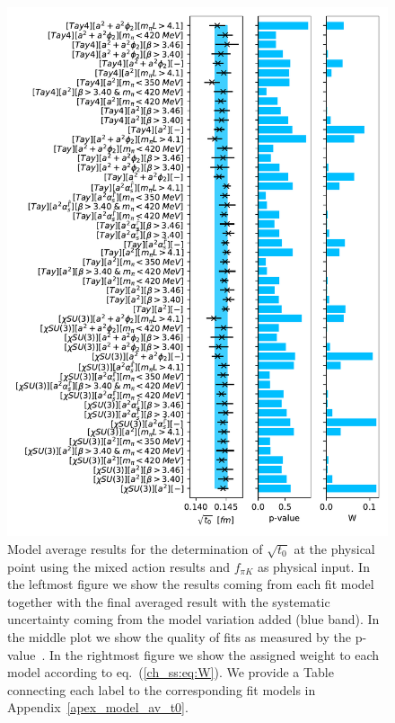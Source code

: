 {\begin{figure}
    \centering
    \includegraphics[width=1.\textwidth]{./cap5/figs/BMA_tm.pdf}
    \caption{Model average results for the determination of $\sqrt{t_0}$ at the physical point using the mixed action results and $f_{\pi K}$ as physical input. In the leftmost figure we show the results coming from each fit model together with the final averaged result with the systematic uncertainty coming from the model variation added (blue band). In the middle plot we show the quality of fits as measured by the p-value~\citep{Bruno:2022mfy}. In the rightmost figure we show the assigned weight to each model according to eq.~(\ref{ch_ss:eq:W}). We provide a Table connecting each label to the corresponding fit models in Appendix~\ref{apex_model_av_t0}.}
    \label{ch_ss:fig:BMA_tm}
\end{figure}

}
